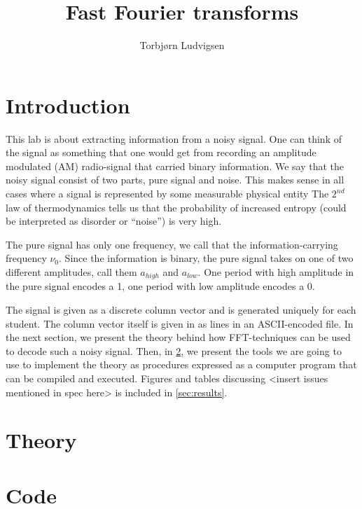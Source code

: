 \documentclass[12pt,a4paper]{article}
\author{Torbjørn Ludvigsen}
\title{Fast Fourier transforms}
\begin{document}
\maketitle
%

\begin{abstract}
\end{abstract}

\vspace{2cm}
\tableofcontents
\clearpage

\section{Introduction}
This lab is about extracting information from a noisy signal.
One can think of the signal as something that one would get from
recording an amplitude modulated (AM) radio-signal that carried binary information.
We say that the noisy signal consist of two parts, pure signal and noise.
This makes sense in all cases where a signal is represented by some measurable
physical entity The $2^{nd}$ law of thermodynamics tells us that the
probability of increased entropy (could be interpreted as disorder or ``noise'') is very high.

The pure signal has only one frequency, we call that the information-carrying
frequency $\nu_0$. Since the information is binary, the pure signal
takes on one of two different amplitudes, call them $a_{high}$ and $a_{low}$.
One period with high amplitude in the pure signal encodes a 1, one period with
low amplitude encodes a 0.

The signal is given as a discrete column vector and is generated uniquely for each student.
The column vector itself is given in as lines in an ASCII-encoded file.
In the next section, we present the theory behind how FFT-techniques can be used to decode such a noisy signal.
Then, in \ref{sec:code}, we present the tools we are going to use to implement the theory as
procedures expressed as a computer program that can be compiled and executed.
Figures and tables discussing <insert issues mentioned in spec here> is
included in \ref{sec:results}.


\section{Theory}\label{sec:code}

\section{Code}
\end{document}
